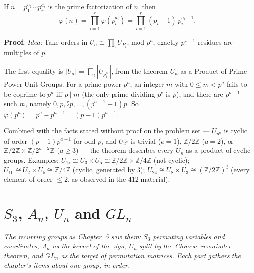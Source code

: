 \documentclass[11pt]{report}
\renewenvironment{proof}[1][Proof]{\noindent\textbf{#1.} }{\hfill$\square$\par\vspace{5pt}}
\begin{document}
\begin{corbox}\label{cor:eulers-totient-formula}
If $n = p_1^{a_1} \cdots p_r^{a_r}$ is the prime factorization of $n$, then
\[ \varphi(n) = \prod_{i=1}^{r} \varphi(p_i^{a_i}) = \prod_{i=1}^{r} (p_i - 1)\,p_i^{a_i - 1}. \]
\end{corbox}

\begin{proof}
\textit{Idea:} Take orders in $U_n \cong \prod_i U_{P_i}$; mod $p^a$, exactly $p^{a-1}$ residues are multiples of $p$.\par
The first equality is $|U_n| = \prod_i |U_{p_i^{a_i}}|$, from the theorem $U_n$ as a Product of Prime-Power Unit Groups. For a prime power $p^a$, an integer $m$ with $0 \leq m < p^a$ fails to be coprime to $p^a$ iff $p \mid m$ (the only prime dividing $p^a$ is $p$), and there are $p^{a-1}$ such $m$, namely $0, p, 2p, \ldots, (p^{a-1} - 1)p$. So $\varphi(p^a) = p^a - p^{a-1} = (p - 1)p^{a-1}$.
\end{proof}

\begin{exbox}\label{ex:unit-groups-via-decomposition}
Combined with the facts stated without proof on the problem set --- $U_{p^a}$ is cyclic of order $(p-1)p^{a-1}$ for odd $p$, and $U_{2^a}$ is trivial ($a = 1$), $\mathbb{Z}/2\mathbb{Z}$ ($a = 2$), or $\mathbb{Z}/2\mathbb{Z} \times \mathbb{Z}/2^{a-2}\mathbb{Z}$ ($a \geq 3$) --- the theorem describes every $U_n$ as a product of cyclic groups. Examples: $U_{15} \cong U_3 \times U_5 \cong \mathbb{Z}/2\mathbb{Z} \times \mathbb{Z}/4\mathbb{Z}$ (not cyclic); $U_{10} \cong U_2 \times U_5 \cong \mathbb{Z}/4\mathbb{Z}$ (cyclic, generated by $3$); $U_{24} \cong U_8 \times U_3 \cong (\mathbb{Z}/2\mathbb{Z})^3$ (every element of order $\leq 2$, as observed in the 412 material).
\end{exbox}


\section{\texorpdfstring{$S_3$, $A_n$, $U_n$ and $GL_n$}{S₃, Aₙ, Uₙ and GLₙ}}\label{sec:rev-ch5}

\textit{The recurring groups as Chapter~5 saw them: $S_3$ permuting variables and coordinates, $A_n$ as the kernel of the sign, $U_n$ split by the Chinese remainder theorem, and $GL_n$ as the target of permutation matrices. Each part gathers the chapter's items about one group, in order.}
\end{document}
